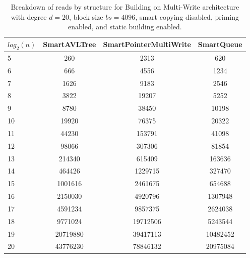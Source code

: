 \begin{table}[]
\centering
\begin{tabular}{|l|c|c|c|}
$log_2(n)$ & SmartAVLTree & SmartPointerMultiWrite & SmartQueue \\ \hline
5 & 260 & 2313 & 620 \\ \hline
6 & 666 & 4556 & 1234 \\ \hline
7 & 1626 & 9183 & 2546 \\ \hline
8 & 3822 & 19207 & 5252 \\ \hline
9 & 8780 & 38450 & 10198 \\ \hline
10 & 19920 & 76375 & 20322 \\ \hline
11 & 44230 & 153791 & 41098 \\ \hline
12 & 98066 & 307306 & 81854 \\ \hline
13 & 214340 & 615409 & 163636 \\ \hline
14 & 464426 & 1229715 & 327470 \\ \hline
15 & 1001616 & 2461675 & 654688 \\ \hline
16 & 2150030 & 4920796 & 1307948 \\ \hline
17 & 4591234 & 9857375 & 2624038 \\ \hline
18 & 9771024 & 19712506 & 5243544 \\ \hline
19 & 20719880 & 39417113 & 10482452 \\ \hline
20 & 43776230 & 78846132 & 20975084 \\ \hline
\end{tabular}
\caption{Breakdown of reads by structure for Building on Multi-Write architecture with degree $d=20$, block size $bs=4096$, smart copying disabled, priming enabled, and static building enabled.}
    \label{tab:reads_by_structure_build_d20_bs4096_copiesfalse_primetrue_staticinsertiontrue_ptmultiwrite_movetrue}
\end{table}


